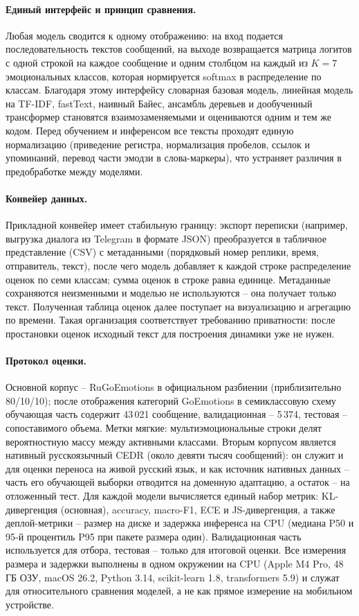 \documentclass[12pt,a4paper]{report}
\begin{document}
\paragraph{Единый интерфейс и принцип сравнения.} Любая модель сводится к одному отображению: на вход подается последовательность текстов сообщений, на выходе возвращается матрица логитов с одной строкой на каждое сообщение и одним столбцом на каждый из \(K=7\) эмоциональных классов, которая нормируется softmax в распределение по классам. Благодаря этому интерфейсу словарная базовая модель, линейная модель на TF-IDF, fastText, наивный Байес, ансамбль деревьев и дообученный трансформер становятся взаимозаменяемыми и оцениваются одним и тем же кодом. Перед обучением и инференсом все тексты проходят единую нормализацию (приведение регистра, нормализация пробелов, ссылок и упоминаний, перевод части эмодзи в слова-маркеры), что устраняет различия в предобработке между моделями.

\paragraph{Конвейер данных.} Прикладной конвейер имеет стабильную границу: экспорт переписки (например, выгрузка диалога из Telegram в формате JSON) преобразуется в табличное представление (CSV) с метаданными (порядковый номер реплики, время, отправитель, текст), после чего модель добавляет к каждой строке распределение оценок по семи классам; сумма оценок в строке равна единице. Метаданные сохраняются неизменными и моделью не используются -- она получает только текст. Полученная таблица оценок далее поступает на визуализацию и агрегацию по времени. Такая организация соответствует требованию приватности: после простановки оценок исходный текст для построения динамики уже не нужен.

\paragraph{Протокол оценки.} Основной корпус -- RuGoEmotions в официальном разбиении (приблизительно 80/10/10); после отображения категорий GoEmotions в семиклассовую схему обучающая часть содержит 43\,021 сообщение, валидационная -- 5\,374, тестовая -- сопоставимого объема. Метки мягкие: мультиэмоциональные строки делят вероятностную массу между активными классами. Вторым корпусом является нативный русскоязычный CEDR (около девяти тысяч сообщений): он служит и для оценки переноса на живой русский язык, и как источник нативных данных -- часть его обучающей выборки отводится на доменную адаптацию, а остаток -- на отложенный тест. Для каждой модели вычисляется единый набор метрик: KL-дивергенция (основная), accuracy, macro-F1, ECE и JS-дивергенция, а также деплой-метрики -- размер на диске и задержка инференса на CPU (медиана P50 и 95-й процентиль P95 при пакете размера один). Валидационная часть используется для отбора, тестовая -- только для итоговой оценки. Все измерения размера и задержки выполнены в одном окружении на CPU (Apple M4 Pro, 48 ГБ ОЗУ, macOS 26.2, Python 3.14, scikit-learn 1.8, transformers 5.9) и служат для относительного сравнения моделей, а не как прямое измерение на мобильном устройстве.
\end{document}
